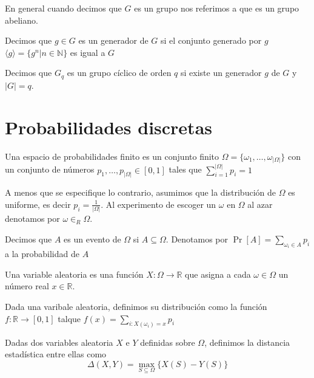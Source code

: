 En general cuando decimos que $G$ es un grupo nos referimos a que es un grupo abeliano.

\begin{definicion}[Generador]
Decimos que $g\in G$ es un generador de $G$ si el conjunto generado por $g$ 
$\langle g \rangle = \{g^n|n\in\mathbb{N}\}$ es igual a $G$
\end{definicion}

\begin{definicion}
Decimos que $G_q$ es un grupo cíclico de orden $q$ si existe un generador
$g$ de $G$ y $|G| = q$.

\end{definicion}

\section{Probabilidades discretas}

\begin{definicion}
Una espacio de probabilidades finito es un conjunto finito
$\Omega = \{\omega_1, \ldots, \omega_{|\Omega|}\}$ con un conjunto
de números $p_1, \ldots, p_{|\Omega|} \in [0,1]$ tales que
$\sum_{i=1}^{|\Omega|}p_i=1$
\end{definicion}

A menos que se especifique lo contrario, asumimos que la distribución
de $\Omega$ es uniforme, es decir $p_i = \frac{1}{|\Omega|}$. Al experimento
de escoger un $\omega$ en $\Omega$ al azar denotamos por $\omega \in_R \Omega$.

\begin{definicion}[Evento]
Decimos que $A$ es un evento de $\Omega$ si $A \subseteq \Omega$. Denotamos
por $\Pr[A] = \sum_{\omega_i \in A}p_i$  a la probabilidad de $A$
\end{definicion}

\begin{definicion}
Una variable aleatoria es una función $X:\Omega \to \mathbb{R}$ que asigna a
cada $\omega \in \Omega$ un número real $x \in \mathbb{R}$.
\end{definicion}

\begin{definicion}[Distribución]
Dada una varibale aleatoria, definimos su distribución como la función
$f:\mathbb{R} \to [0,1]$ talque $f(x) = \sum_{i:X(\omega_i)=x}p_i$
\end{definicion}

\begin{definicion}
Dadas dos variables aleatoria $X$ e $Y$ definidas sobre $\Omega$, definimos
la distancia estadística entre ellas como
$$\Delta(X, Y) = \max_{S\subseteq \Omega}\{X(S)-Y(S)\}$$
\end{definicion}

